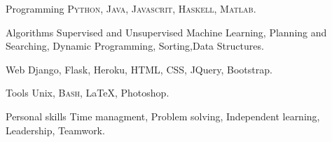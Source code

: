 

\begin{cvskills}

  \cvskill
    {Programming} %
    {\textsc{Python}, \textsc{Java}, \textsc{Javascrit}, \textsc{Haskell}, \textsc{Matlab}.} %

  \cvskill    
    {Algorithms} %
    {Supervised and Unsupervised Machine Learning, Planning and Searching, Dynamic Programming, \newline Sorting,Data Structures.} %

  \cvskill
    {Web} %
    {Django, Flask, Heroku, \textsc{HTML}, \textsc{CSS}, JQuery, Bootstrap.} %

  \cvskill
    {Tools} %
    {Unix, \textsc{Bash}, \LaTeX, Photoshop.} %

\cvskill
    {Personal skills} %
    {Time managment, Problem solving, Independent learning, Leadership, Teamwork.} %

\end{cvskills}
